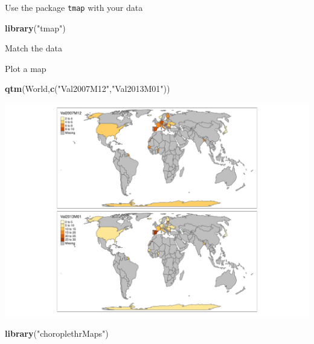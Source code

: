 \documentclass[
  ignorenonframetext,
]{beamer}
\newenvironment{Shaded}{\begin{snugshade}}{\end{snugshade}}
\newcommand{\DecValTok}[1]{\textcolor[rgb]{0.00,0.00,0.81}{#1}}
\newcommand{\KeywordTok}[1]{\textcolor[rgb]{0.13,0.29,0.53}{\textbf{#1}}}
\newcommand{\NormalTok}[1]{#1}
\newcommand{\OperatorTok}[1]{\textcolor[rgb]{0.81,0.36,0.00}{\textbf{#1}}}
\newcommand{\StringTok}[1]{\textcolor[rgb]{0.31,0.60,0.02}{#1}}
\begin{document}
\begin{frame}[fragile]{Use the package \texttt{tmap} with your data}
\protect\hypertarget{use-the-package-tmap-with-your-data}{}
\begin{Shaded}
\begin{Highlighting}[]
\KeywordTok{library}\NormalTok{(}\StringTok{"tmap"}\NormalTok{)}
\end{Highlighting}
\end{Shaded}

\begin{block}{Match the data}
\protect\hypertarget{match-the-data}{}
\begin{Shaded}
\end{Shaded}
\end{block}
\end{frame}

\begin{frame}[fragile]{Plot a map}
\protect\hypertarget{plot-a-map}{}
\begin{Shaded}
\begin{Highlighting}[]
\KeywordTok{qtm}\NormalTok{(World,}\KeywordTok{c}\NormalTok{(}\StringTok{"Val2007M12"}\NormalTok{,}\StringTok{"Val2013M01"}\NormalTok{))}
\end{Highlighting}
\end{Shaded}

\includegraphics{quick_high_quality_maps_files/figure-beamer/unnamed-chunk-46-1.pdf}
\end{frame}

\begin{frame}[fragile]{}
\protect\hypertarget{section-1}{}
\begin{Shaded}
\begin{Highlighting}[]
\KeywordTok{library}\NormalTok{(}\StringTok{"choroplethrMaps"}\NormalTok{)}
\end{Highlighting}
\end{Shaded}
\end{frame}
\end{document}
